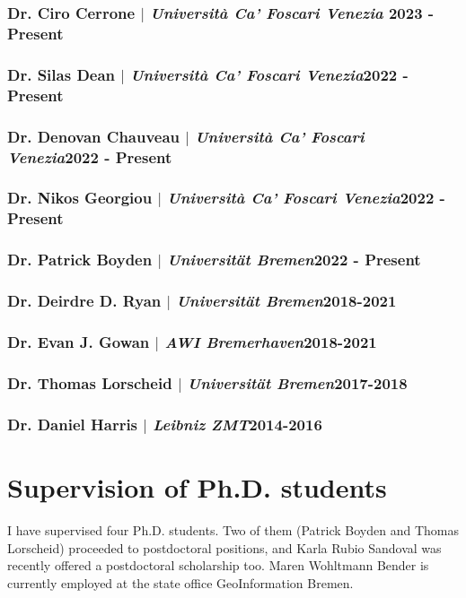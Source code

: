 \documentclass[11pt]{article}
\begin{document}
\bigskip
\subsubsection{Dr. Ciro Cerrone $|$ {\normalfont\textit{Università Ca' Foscari Venezia}} \hfill 2023 - Present}
\smallskip
\subsubsection{Dr. Silas Dean $|$ {\normalfont\textit{Università Ca' Foscari Venezia}}\hfill 2022 - Present}
\smallskip
\subsubsection{Dr. Denovan Chauveau $|$ {\normalfont\textit{Università Ca' Foscari Venezia}}\hfill 2022 - Present}
\smallskip
\subsubsection{Dr. Nikos Georgiou $|$ {\normalfont\textit{Università Ca' Foscari Venezia}}\hfill 2022 - Present}
\smallskip
\subsubsection{Dr. Patrick Boyden $|$ {\normalfont\textit{Universität Bremen}}\hfill 2022 - Present}
\smallskip
\subsubsection{Dr. Deirdre D. Ryan $|$ {\normalfont\textit{Universität Bremen}}\hfill 2018-2021}
\smallskip
\subsubsection{Dr. Evan J. Gowan $|$ {\normalfont\textit{AWI Bremerhaven}}\hfill 2018-2021}
\smallskip
\subsubsection{Dr. Thomas Lorscheid $|$ {\normalfont\textit{Universität Bremen}}\hfill 2017-2018}
\smallskip
\subsubsection{Dr. Daniel Harris $|$ {\normalfont\textit{Leibniz ZMT}}\hfill 2014-2016}
\bigskip

\section{Supervision of Ph.D. students}
{\normalfont I have supervised four Ph.D. students. Two of them (Patrick Boyden and Thomas Lorscheid) proceeded to postdoctoral positions, and Karla Rubio Sandoval was recently offered a postdoctoral scholarship too. Maren Wohltmann Bender is currently employed at the state office GeoInformation Bremen.}
\bigskip
\end{document}

